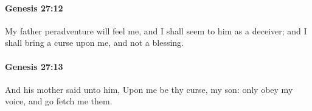 		\paragraph{Genesis 27:12} %
			\label{GENESIS-27-12}

			My father peradventure will feel me, and I shall seem to him as a deceiver; and I shall bring a curse upon me, and not a blessing.


		\paragraph{Genesis 27:13} %
			\label{GENESIS-27-13}

			And his mother said unto him, Upon me be thy curse, my son: only obey my voice, and go fetch me them.


